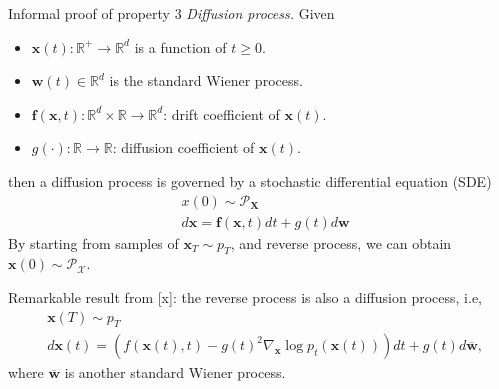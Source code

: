 \documentclass[10pt,xcolor={usenames,dvipsnames,table},aspectratio=169]{beamer}
\begin{document}
\begin{frame}{Informal proof of property 3}
\textit{Diffusion process.} Given
\begin{itemize}
    \item $\bm{x}(t): \mathbb{R}^{+} \to \mathbb{R}^{d}$ is a function of $t \geq 0$.
    \item $\bm{w}(t) \in \mathbb{R}^{d}$ is the standard Wiener process.
    \item $\bm{f}(\bm{x}, t): \mathbb{R}^{d} \times \mathbb{R} \to \mathbb{R}^{d}$: drift coefficient of $\bm{x}(t)$.
    \item $g(\cdot): \mathbb{R} \to \mathbb{R}$: diffusion coefficient of $\bm{x}(t)$.
\end{itemize}
then a diffusion process is governed by a stochastic differential equation (SDE)
\begin{subequations}
\label{eq:sde_forward}
\begin{align}
&x(0) \sim \mathcal{P}_{\bm{X}} \\
&d \bm{x} = \bm{f}(\bm{x}, t) dt + g(t) d \bm{w}
\end{align}
\end{subequations} 
By starting from samples of $\bm{x}_T \sim p_T$, and reverse process, we can obtain $\bm{x}(0) \sim \mathcal{P}_{\mathcal{X}}$.

Remarkable result from [x]: the reverse process is also a diffusion process, i.e, 
\begin{subequations}
\label{eq:sde_backward}    
\begin{align}
& \bm{x}(T) \sim p_T \\
&d \bm{x}(t) = \left( f(\bm{x}(t), t) - g(t)^2 \nabla_{\bm{x}} \log p_{t}(\bm{x}(t))\right)dt  + g(t)d \overline{\bm{w}},
\end{align} 
\end{subequations}
where $\overline{\bm{w}}$ is another standard Wiener process.
\end{frame}
\end{document}
